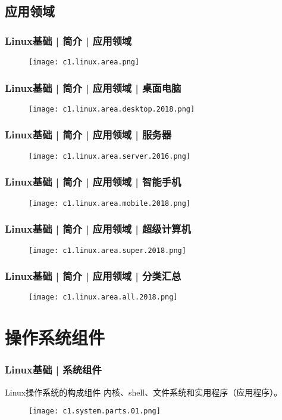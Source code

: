 \subsection{应用领域}
\begin{frame}
  \frametitle{Linux基础 | 简介 | 应用领域}
  \begin{figure}
    \centering
    \texttt{[image: c1.linux.area.png]}
  \end{figure}
\end{frame}

\begin{frame}
  \frametitle{Linux基础 | 简介 | 应用领域 | 桌面电脑}
  \begin{figure}
    \centering
    \texttt{[image: c1.linux.area.desktop.2018.png]}
  \end{figure}
\end{frame}

\begin{frame}
  \frametitle{Linux基础 | 简介 | 应用领域 | 服务器}
  \begin{figure}
    \centering
    \texttt{[image: c1.linux.area.server.2016.png]}
  \end{figure}
\end{frame}

\begin{frame}
  \frametitle{Linux基础 | 简介 | 应用领域 | 智能手机}
  \begin{figure}
    \centering
    \texttt{[image: c1.linux.area.mobile.2018.png]}
  \end{figure}
\end{frame}

\begin{frame}
  \frametitle{Linux基础 | 简介 | 应用领域 | 超级计算机}
  \begin{figure}
    \centering
    \texttt{[image: c1.linux.area.super.2018.png]}
  \end{figure}
\end{frame}

\begin{frame}
  \frametitle{Linux基础 | 简介 | 应用领域 | 分类汇总}
  \begin{figure}
    \centering
    \texttt{[image: c1.linux.area.all.2018.png]}
  \end{figure}
\end{frame}

\section{操作系统组件}
\begin{frame}
  \frametitle{Linux基础 | 系统组件}
  \begin{block}{Linux操作系统的\alert{构成组件}}
    内核、shell、文件系统和实用程序（应用程序）。
  \end{block}
  \begin{figure}
    \centering
    \texttt{[image: c1.system.parts.01.png]}
  \end{figure}
\end{frame}

